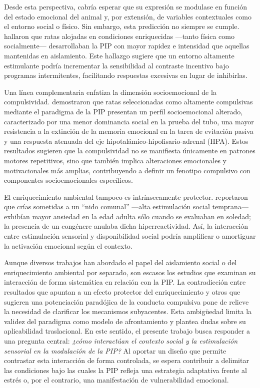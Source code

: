 \documentclass[12pt,a4paper]{article}
\begin{document}
\begin{multicols}{2}
Desde esta perspectiva, cabría esperar que su expresión se modulase en función del estado emocional del animal y, por extensión, de variables contextuales como el entorno social o físico. Sin embargo, esta predicción no siempre se cumple. \citet{FuentesVerdugo2023} hallaron que ratas alojadas en condiciones enriquecidas —tanto física como socialmente— desarrollaban la PIP con mayor rapidez e intensidad que aquellas mantenidas en aislamiento. Este hallazgo sugiere que un entorno altamente estimulante podría incrementar la sensibilidad al contraste incentivo bajo programas intermitentes, facilitando respuestas excesivas en lugar de inhibirlas.

Una línea complementaria enfatiza la dimensión socioemocional de la compulsividad. \citet{MartinGonzalez2022} demostraron que ratas seleccionadas como altamente compulsivas mediante el paradigma de la PIP presentan un perfil socioemocional alterado, caracterizado por una menor dominancia social en la prueba del tubo, una mayor resistencia a la extinción de la memoria emocional en la tarea de evitación pasiva y una respuesta atenuada del eje hipotalámico-hipofisario-adrenal (HPA). Estos resultados sugieren que la compulsividad no se manifiesta únicamente en patrones motores repetitivos, sino que también implica alteraciones emocionales y motivacionales más amplias, contribuyendo a definir un fenotipo compulsivo con componentes socioemocionales específicos.

El enriquecimiento ambiental tampoco es intrínsecamente protector. \citet{Branchi2006} reportaron que crías sometidas a un “nido comunal” —alta estimulación social temprana— exhibían mayor ansiedad en la edad adulta sólo cuando se evaluaban en soledad; la presencia de un congénere anulaba dicha hiperreactividad. Así, la interacción entre estimulación sensorial y disponibilidad social podría amplificar o amortiguar la activación emocional según el contexto.

Aunque diversos trabajos han abordado el papel del aislamiento social o del enriquecimiento ambiental por separado, son escasos los estudios que examinan su interacción de forma sistemática en relación con la PIP. La contradicción entre resultados que apuntan a un efecto protector del enriquecimiento y otros que sugieren una potenciación paradójica de la conducta compulsiva pone de relieve la necesidad de clarificar los mecanismos subyacentes. Esta ambigüedad limita la validez del paradigma como modelo de afrontamiento y plantea dudas sobre su aplicabilidad traslacional. En este sentido, el presente trabajo busca responder a una pregunta central: \textit{¿cómo interactúan el contexto social y la estimulación sensorial en la modulación de la PIP?} Al aportar un diseño que permite contrastar esta interacción de forma controlada, se espera contribuir a delimitar las condiciones bajo las cuales la PIP refleja una estrategia adaptativa frente al estrés o, por el contrario, una manifestación de vulnerabilidad emocional.


\end{multicols}
\end{document}
